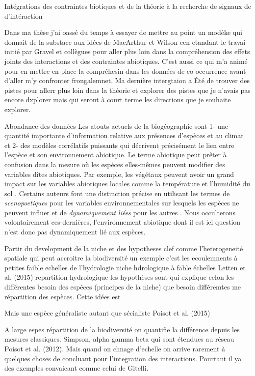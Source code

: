 Intégrations des contraintes biotiques et de la théorie à la recherche
de signaux de d'intéraction

Dans ma thèse j'ai oassé du temps à essayer de mettre au point un modèke
qui donnait de la substace aux idées de MacArthur et Wilson een etandant
le travai initié par Gravel et collègues pour aller plus loin dans la
compréhension des effets joints des interactions et des contraintes
abiotiques. C'est aussi ce qui m'a animé pour en mettre en place la
compréhesin dans les données de co-occurrence avant d'aller m'y
confronter frongalemnet. Ma dernière intergtaion a Été de trouver des
pistes pour allerr plus loin dans la théorie et explorer des pistes que
je n'avais pas encore dxplorer mais qui seront à court terme les
directions que je souhaite explorer.

Abondance des données Les atouts actuels de la biogéographie sont 1- une
quantité importante d'information relative aux présences d'espèces et au
climat et 2- des modèles corrélatifs puissants qui décrivent précisément
le lien entre l'espèce et son environnement abiotique. Le terme
abiotique peut prêter à confusion dans la mesure où les espèces
elles-mêmes peuvent modifier des variables dîtes abiotiques. Par
exemple, les végétaux peuvent avoir un grand impact sur les variables
abiotiques locales comme la température et l'humidité du sol
\cite{Breshears1998}. Certains auteurs font une distinction précise en
utilisant les termes de \textit{scenopoetiques} pour les variables
environnementales sur lesquels les espèces ne peuvent influer et de
\textit{dynamiquement liées} pour les autres \cite{Peterson2011}. Nous
occulterons volontairement ces-dernières, l'environnement abiotique dont
il est ici question n'est donc pas dynamiquement lié aux espèces.

Partir du development de la niche et des hypotheses clef comme
l'heterogeneité spatiale qui peut accroitre la biodiversité un exemple
c'est les ecoulemnents à petites faible echelles de l'hydrologie niche
hdrologique à fable échelles Letten et al. (2015) repartition
hydrologique les hypothèses sont qui explique celon les différentes
besoin des espèces (principes de la niche) que besoin différemtes me
répartition des espèces. Cette idées est

Mais une espèce généraliste autant que sécialiste Poisot et al. (2015)

A large espes répartition de la biodiversité on quantifie la différence
depuis les mesures classiques. Simpson, alpha gamma beta qui sont
étendues au réseau Poisot et al. (2012). Mais quand on chnage d'echelle
on arrive rarement à quelques choses de concluant pour l'integration des
interactions. Pourtant il ya des exemples convaicant comme celui de
Gitelli.

